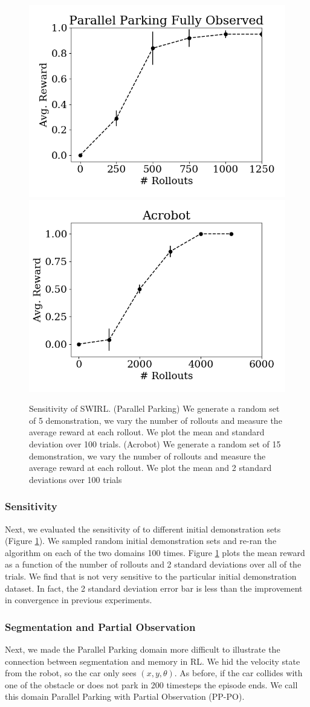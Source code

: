\begin{figure}[ht!]
\centering
 \includegraphics[width=0.48\columnwidth]{swirl-experiments/ppfo-eb1.png}
 \includegraphics[width=0.48\columnwidth]{swirl-experiments/ppfo-eb2.png}
 \caption{Sensitivity of SWIRL. (Parallel Parking) We generate a random set of 5 demonstration, we vary the number of rollouts and measure the average reward at each rollout. We plot the mean and standard deviation over 100 trials.  (Acrobot) We generate a random set of 15 demonstration, we vary the number of rollouts and measure the average reward at each rollout. We plot the mean and 2 standard deviations over 100 trials \label{exp:eb}}
\end{figure}

\subsubsection{Sensitivity}
Next, we evaluated the sensitivity of \hirl to different initial demonstration sets (Figure \ref{exp:eb}). We sampled random initial demonstration sets and re-ran the algorithm on each of the two domains 100 times. Figure \ref{exp:eb} plots the mean reward as a function of the number of rollouts and 2 standard deviations over all of the trials. We find that \hirl is not very sensitive to the particular initial demonstration dataset. In fact, the 2 standard deviation error bar is less than the improvement in convergence in previous experiments.



\subsubsection{Segmentation and Partial Observation}
Next, we made the Parallel Parking domain more difficult to illustrate the connection between segmentation and memory in RL. 
We hid the velocity state from the robot, so the car only sees $(x,y,\theta)$. 
As before, if the car collides with one of the obstacle or does not park in 200 timesteps the episode ends.
We call this domain Parallel Parking with Partial Observation (PP-PO).

